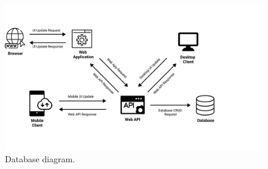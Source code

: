 %
%
%
%

\begin{figure}[H]
    \centering
    \includegraphics[width=1.2\textwidth]{Pictures/Threat_Modeling}
    \caption{Database diagram.}\label{fig:figure4}
\end{figure}